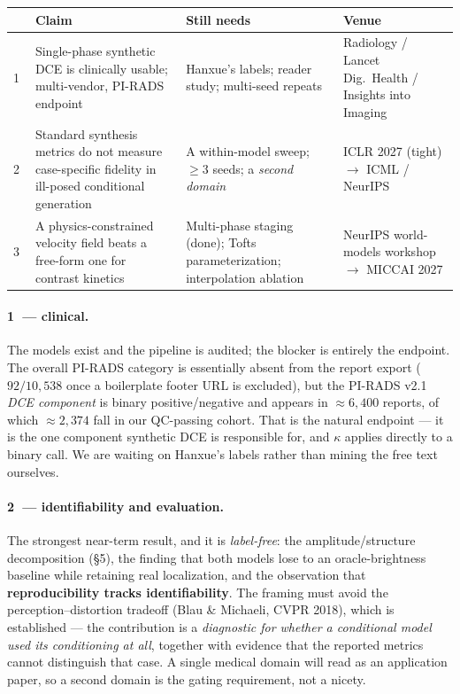 \documentclass[11pt]{article}
\newcommand{\1}{\mathbb{1}}
\begin{document}
\begin{center}
\renewcommand{\arraystretch}{1.25}
\begin{tabular}{p{0.9cm}p{4.4cm}p{4.6cm}p{3.5cm}}
\toprule
& \textbf{Claim} & \textbf{Still needs} & \textbf{Venue} \\
\midrule
\textcircled{1} &
Single-phase synthetic DCE is clinically usable; multi-vendor, PI-RADS endpoint &
Hanxue's labels; reader study; multi-seed repeats &
Radiology / Lancet Dig.\ Health / Insights into Imaging \\
\textcircled{2} &
Standard synthesis metrics do not measure case-specific fidelity in ill-posed conditional
generation &
A within-model sweep; $\ge3$ seeds; a \emph{second domain} &
ICLR 2027 (tight) $\to$ ICML / NeurIPS \\
\textcircled{3} &
A physics-constrained velocity field beats a free-form one for contrast kinetics &
Multi-phase staging (done); Tofts parameterization; interpolation ablation &
NeurIPS world-models workshop $\to$ MICCAI 2027 \\
\bottomrule
\end{tabular}
\end{center}

\paragraph{\textcircled{1} --- clinical.} The models exist and the pipeline is audited; the
blocker is entirely the endpoint. The overall PI-RADS category is essentially absent from the
report export ($92/10{,}538$ once a boilerplate footer URL is excluded), but the PI-RADS v2.1
\emph{DCE component} is binary positive/negative and appears in $\approx6{,}400$ reports, of
which $\approx2{,}374$ fall in our QC-passing cohort. That is the natural endpoint --- it is
the one component synthetic DCE is responsible for, and $\kappa$ applies directly to a binary
call. We are waiting on Hanxue's labels rather than mining the free text ourselves.

\paragraph{\textcircled{2} --- identifiability and evaluation.} The strongest near-term
result, and it is \emph{label-free}: the amplitude/structure decomposition (\S5), the finding
that both models lose to an oracle-brightness baseline while retaining real localization, and
the observation that \textbf{reproducibility tracks identifiability}. The framing must avoid
the perception--distortion tradeoff (Blau \& Michaeli, CVPR 2018), which is established ---
the contribution is a \emph{diagnostic for whether a conditional model used its conditioning
at all}, together with evidence that the reported metrics cannot distinguish that case.
A single medical domain will read as an application paper, so a second domain is the
gating requirement, not a nicety.
\end{document}
